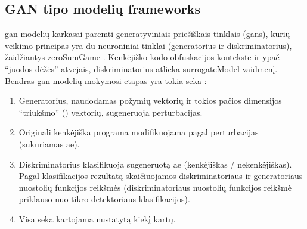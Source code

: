 \subsection{GAN tipo modelių \glspl{framework}}\label{sec:literature:gan}

\acs{gan} modelių karkasai paremti generatyviniais priešiškais tinklais (\aclp{gan}), kurių veikimo principas yra du neuroniniai tinklai (generatorius ir diskriminatorius), žaidžiantys \gls{zeroSumGame} \cite{chenInfoGANInterpretableRepresentation2016a}. Kenkėjiško kodo obfuskacijos kontekste ir ypač \enquote{juodos dėžės} atvejais, diskriminatorius atlieka \gls{surrogateModel} vaidmenį. Bendras \ac{gan} modelių mokymosi etapas yra tokia seka \cite{huGeneratingAdversarialMalware2017,zhuNgramMalGANEvading2022,zhongMalFoxCamouflagedAdversarial2024}:
\begin{enumerate}
    \item Generatorius, naudodamas požymių vektorių ir tokios pačios dimensijos
          \enquote{triukšmo} () vektorių, sugeneruoja perturbacijas.
    \item Originali kenkėjiška programa modifikuojama pagal perturbacijas (sukuriamas
          \ac{ae}).
    \item Diskriminatorius klasifikuoja sugeneruotą \ac{ae} (kenkėjiškas /
          nekenkėjiškas). Pagal klasifikacijos rezultatą skaičiuojamos diskriminatoriaus
          ir generatoriaus nuostolių funkcijos reikšmės (diskriminatoriaus nuostolių
          funkcijos reikšmė priklauso nuo tikro detektoriaus klasifikacijos).
    \item Visa seka kartojama nustatytą kiekį kartų.
\end{enumerate}

